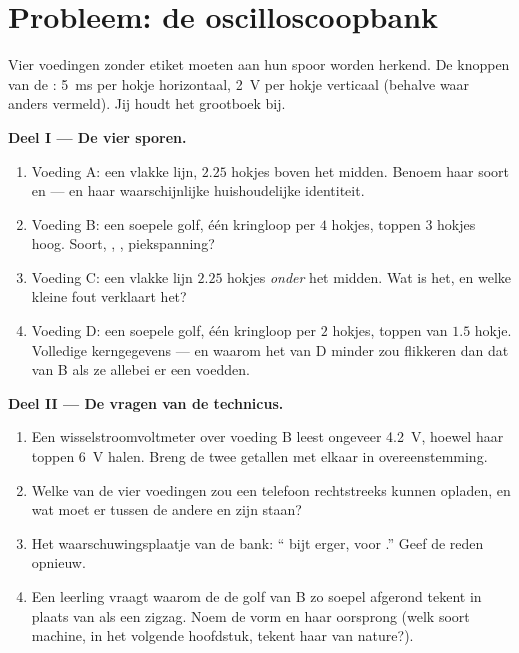 \section{Probleem: de oscilloscoopbank}

\begin{problem}\label{pb:g9:alternating-current:1}
Vier voedingen zonder etiket moeten aan hun spoor worden herkend. De
knoppen van de : \qty{5}{ms} per hokje horizontaal,
\qty{2}{V} per hokje verticaal (behalve waar anders vermeld). Jij houdt
het grootboek bij.

\medskip\noindent\textbf{Deel I --- De vier sporen.}
\begin{enumerate}
  \item Voeding A: een vlakke lijn, $2.25$ hokjes boven het midden.
        Benoem haar soort en  --- en haar
        waarschijnlijke huishoudelijke identiteit.
  \item Voeding B: een soepele golf, één kringloop per $4$ hokjes,
        toppen $3$ hokjes hoog. Soort, ,
        , piekspanning?
  \item Voeding C: een vlakke lijn $2.25$ hokjes \emph{onder} het
        midden. Wat is het, en welke kleine fout verklaart het?
  \item Voeding D: een soepele golf, één kringloop per $2$ hokjes,
        toppen van $1.5$ hokje. Volledige kerngegevens --- en waarom
        het  van D minder zou flikkeren dan dat van B als ze
        allebei er een voedden.
\end{enumerate}

\medskip\noindent\textbf{Deel II --- De vragen van de technicus.}
\begin{enumerate}[resume]
  \item Een wisselstroomvoltmeter over voeding B leest ongeveer
        \qty{4.2}{V}, hoewel haar toppen \qty{6}{V} halen. Breng de
        twee getallen met elkaar in overeenstemming.
  \item Welke van de vier voedingen zou een telefoon rechtstreeks
        kunnen opladen, en wat moet er tussen de andere en zijn
         staan?
  \item Het waarschuwingsplaatje van de bank: `` bijt
        erger,  voor .'' Geef de reden
        opnieuw.
  \item Een leerling vraagt waarom de  de golf van B zo
        soepel afgerond tekent in plaats van als een zigzag. Noem de
        vorm en haar oorsprong (welk soort machine, in het volgende
        hoofdstuk, tekent haar van nature?).
\end{enumerate}


\end{problem}
